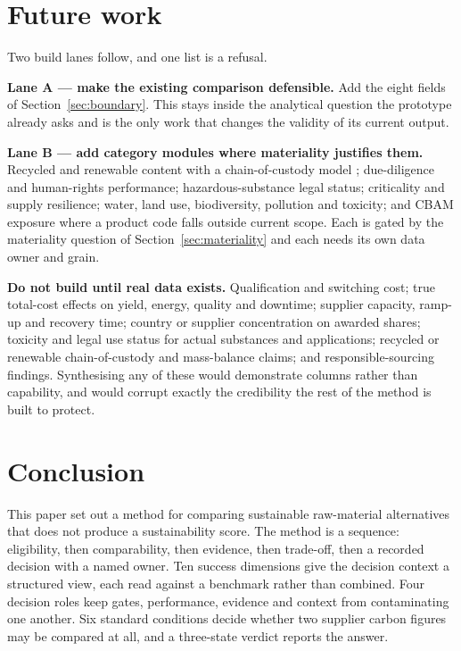 \documentclass[10pt,twocolumn,a4paper]{article}
\begin{document}
\section{Future work}

Two build lanes follow, and one list is a refusal.

\textbf{Lane A --- make the existing comparison defensible.} Add the eight fields
of Section~\ref{sec:boundary}. This stays inside the analytical question the
prototype already asks and is the only work that changes the validity of its
current output.

\textbf{Lane B --- add category modules where materiality justifies them.}
Recycled and renewable content with a chain-of-custody model \cite{v5};
due-diligence and human-rights performance; hazardous-substance legal status;
criticality and supply resilience; water, land use, biodiversity, pollution and
toxicity; and CBAM exposure where a product code falls outside current scope.
Each is gated by the materiality question of Section~\ref{sec:materiality} and
each needs its own data owner and grain.

\textbf{Do not build until real data exists.} Qualification and switching cost;
true total-cost effects on yield, energy, quality and downtime; supplier capacity,
ramp-up and recovery time; country or supplier concentration on awarded shares;
toxicity and legal use status for actual substances and applications; recycled or
renewable chain-of-custody and mass-balance claims; and responsible-sourcing
findings. Synthesising any of these would demonstrate columns rather than
capability, and would corrupt exactly the credibility the rest of the method is
built to protect.

\section{Conclusion}

This paper set out a method for comparing sustainable raw-material alternatives
that does not produce a sustainability score. The method is a sequence:
eligibility, then comparability, then evidence, then trade-off, then a recorded
decision with a named owner. Ten success dimensions give the decision context a
structured view, each read against a benchmark rather than combined. Four
decision roles keep gates, performance,
evidence and context from contaminating one another. Six standard conditions
decide whether two supplier carbon figures may be compared at all, and a
three-state verdict reports the answer.
\end{document}
